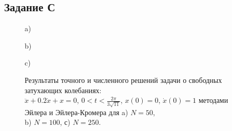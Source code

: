 \documentclass[
11pt,
master, %
subf, %
href, %
colorlinks=true, %
times, %
]{disser}
\begin{document}
\newpage
\subsection{Задание С}
\begin{figure}[h!]
\begin{minipage}[h]{1\linewidth}
 a) \\
\end{minipage}
\vfill
\begin{minipage}[h]{1\linewidth}
 b) \\
\end{minipage}
\vfill
\begin{minipage}[h]{1\linewidth}
 c) \\
\end{minipage}
\caption{Результаты точного и численного решений задачи о свободных затухающих колебаниях:\\
 $\ddot{x} + 0.2 \dot{x} + x = 0$, $0<t<\frac{2 \pi}{3\sqrt{11}}$, $x(0) = 0$, $\dot{x}(0) = 1$  методами Эйлера и Эйлера-Кромера для a) $N = 50$,\\
  b) $N = 100$, с) $N = 250$.}
\label{ris:5}
\end{figure}
\end{document}
